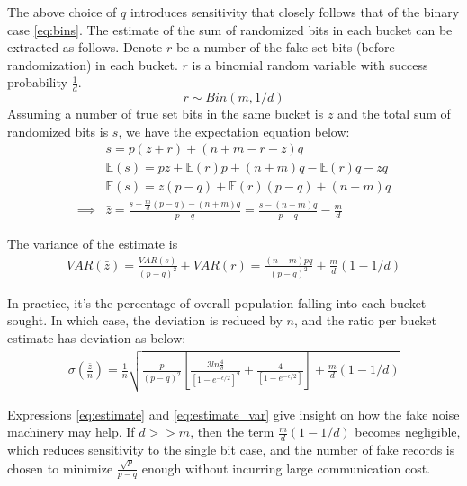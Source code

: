 \documentclass[11pt]{article}
\newcommand{\E}{\mathbb{E}} %
\begin{document}
The above choice of $q$ introduces sensitivity that closely follows that of the binary case \ref{eq:bins}.    The estimate of the sum of randomized bits in each bucket can be extracted as follows.  Denote $r$ be a number of the fake set bits (before randomization) in each bucket. $r$ is a binomial random variable with success probability $\frac{1}{d}$.
\[ r \sim Bin(m, 1/d) \]
Assuming a number of true set bits in the same bucket is $z$ and the total sum of randomized bits is $s$, we have the expectation equation below: 
\begin{align}
& s = p(z + r)  + (n+m - r - z)q \\
& \E(s) = pz + \E(r)p + (n+m)q - \E(r)q - zq\\
& \E(s) = z(p-q) + \E(r)(p-q) + (n+m)q \\
\implies & \bar{z} = \frac{s - \frac{m}{d}(p-q) - (n+m)q}{p-q} =  \frac{s - (n+m)q}{p-q}  - \frac{m}{d} \label{eq:estimate}
\end{align}

The variance of the estimate is
\begin{align*}
VAR( \bar{z} ) =  \frac{VAR(s)}{(p-q)^2}  + VAR(r) = \frac{(n+m)pq}{(p-q)^2} + \frac{m}{d}(1-1/d)
\end{align*}


In practice, it's the percentage of overall population falling into each bucket sought.  In which case, the deviation is reduced by $n$, and the ratio per bucket estimate has deviation as below:
\begin{align}
\sigma( \frac{\bar{z}}{n} ) =  \frac{1}{n} \sqrt { \frac{p}{(p-q)^2} \left [   \frac  { 3  ln\frac{4}{\delta}}  { \left [ 1 - e^{-\epsilon/2}\right ] ^2}  + \frac{4}{ \left [ 1 - e^{-\epsilon/2}\right ] }   \right ] + \frac{m}{d}(1-1/d) } \label{eq:estimate_var}
\end{align}

Expressions \ref{eq:estimate} and \ref{eq:estimate_var} give insight on how the fake noise machinery may help.  If $d >> m$, then the term $\frac{m}{d}(1-1/d)$ becomes negligible, which reduces sensitivity to the single bit case, and the number of fake records is chosen to minimize $\frac{\sqrt{p}}{p-q}$ enough without incurring large communication cost. 
\end{document}
